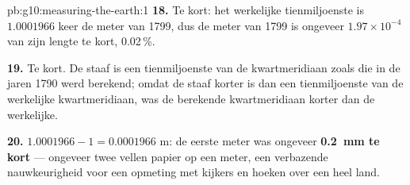 \begin{solution}{pb:g10:measuring-the-earth:1}
\textbf{18.} Te kort: het werkelijke tienmiljoenste is $1.0001966$ keer de meter
van 1799, dus de meter van 1799 is ongeveer $1.97 \times 10^{-4}$ van zijn
lengte te kort, 0.02\,\%.

\textbf{19.} Te kort. De staaf is een tienmiljoenste van de kwartmeridiaan
zoals die in de jaren 1790 werd berekend; omdat de staaf korter is dan een
tienmiljoenste van de werkelijke kwartmeridiaan, was de berekende
kwartmeridiaan korter dan de werkelijke.

\textbf{20.} $1.0001966 - 1 = 0.0001966$ m: de eerste meter was ongeveer
\textbf{\qty{0.2}{mm} te kort} --- ongeveer twee vellen papier op een meter,
een verbazende nauwkeurigheid voor een opmeting met kijkers en hoeken over
een heel land.
\end{solution}
